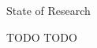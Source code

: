 \begin{section}{State of Research}
\begin{subsection}{TODO}
    TODO
\end{subsection}
\end{section}
